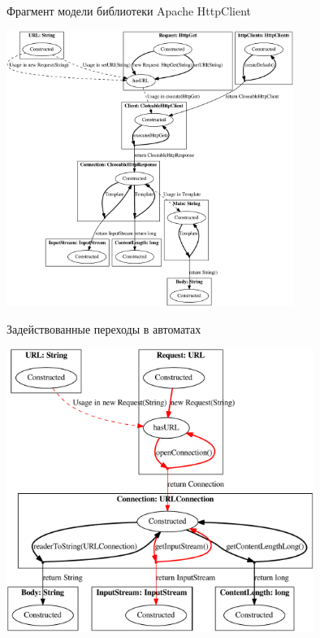 \documentclass[12pt]{beamer}
\begin{document}
\begin{frame}{Фрагмент модели библиотеки Apache HttpClient}
\begin{center}
	\includegraphics[width=0.7\textwidth]{apache-cropped.pdf}
\end{center}
\end{frame}

\begin{frame}{Задействованные переходы в автоматах}
\begin{center}
	\includegraphics[width=0.75\textwidth]{javaPath-cropped.pdf}
\end{center}
\end{frame}
\end{document}
